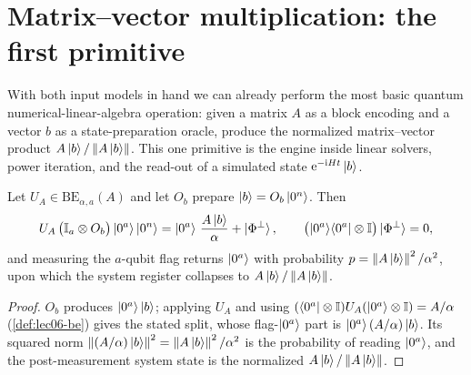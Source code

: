 \section{Matrix--vector multiplication: the first primitive}
\label{sec:lec06-matvec}

With both input models in hand we can already perform the most basic
quantum numerical-linear-algebra operation: given a matrix $A$ as a block encoding
and a vector $b$ as a state-preparation oracle, produce the normalized
matrix--vector product $A\ket{b}/\left\lVert A\ket{b} \right\rVert$. This one primitive is the engine
inside linear solvers, power iteration, and the read-out of a simulated state
$\mathrm{e}^{-\mathrm{i} Ht}\ket{b}$.

\begin{proposition}
\label{prop:lec06-matvec}
Let $U_A\in\mathrm{BE}_{\alpha,a}(A)$ and let $O_b$ prepare $\ket{b}=O_b\ket{0^n}$.
Then
\[
  U_A\,\bigl(\mathbb{I}_a\otimes O_b\bigr)\ket{0^a}\ket{0^n}
  =\ket{0^a}\,\frac{A\ket{b}}{\alpha}+\ket{\Phi^{\perp}},
  \qquad \bigl(\ket{0^a}\!\bra{0^a}\otimes\mathbb{I}\bigr)\ket{\Phi^{\perp}}=0,
\]
and measuring the $a$-qubit flag returns $\ket{0^a}$ with probability
$p=\left\lVert A\ket{b} \right\rVert^2/\alpha^2$, upon which the system register collapses to
$A\ket{b}/\left\lVert A\ket{b} \right\rVert$.
\end{proposition}

\begin{proof}
$O_b$ produces $\ket{0^a}\ket{b}$; applying $U_A$ and using
$(\bra{0^a}\otimes\mathbb{I})U_A(\ket{0^a}\otimes\mathbb{I})=A/\alpha$ (\cref{def:lec06-be}) gives
the stated split, whose flag-$\ket{0^a}$ part is $\ket{0^a}(A/\alpha)\ket{b}$. Its
squared norm $\left\lVert (A/\alpha)\ket{b} \right\rVert^2=\left\lVert A\ket{b} \right\rVert^2/\alpha^2$ is the
probability of reading $\ket{0^a}$, and the post-measurement system state is the
normalized $A\ket{b}/\left\lVert A\ket{b} \right\rVert$.
\end{proof}

